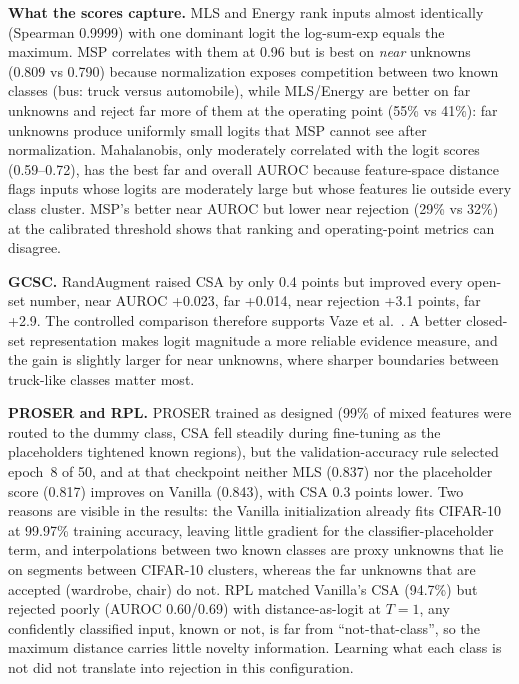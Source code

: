 \documentclass{article}
\begin{document}
\textbf{What the scores capture.} MLS and Energy rank inputs almost identically (Spearman 0.9999) with one dominant logit the log-sum-exp equals the maximum. MSP correlates with them at 0.96 but is best on \emph{near} unknowns (0.809 vs 0.790) because normalization exposes competition between two known classes (bus: truck versus automobile), while MLS/Energy are better on far unknowns and reject far more of them at the operating point (55\% vs 41\%): far unknowns produce uniformly small logits that MSP cannot see after normalization. Mahalanobis, only moderately correlated with the logit scores (0.59--0.72), has the best far and overall AUROC because feature-space distance flags inputs whose logits are moderately large but whose features lie outside every class cluster. MSP's better near AUROC but lower near rejection
(29\% vs 32\%) at the calibrated threshold shows that ranking and operating-point metrics can disagree.

\textbf{GCSC.} RandAugment raised CSA by only 0.4 points but improved every open-set number, near AUROC +0.023, far +0.014, near rejection +3.1 points, far +2.9. The controlled comparison therefore supports Vaze et al.~\cite{vaze2022osr}.  A better closed-set representation makes logit magnitude a more reliable evidence measure, and the gain is slightly larger for near unknowns, where sharper boundaries between truck-like classes matter most.

\textbf{PROSER and RPL.} PROSER trained as designed (99\% of mixed features were routed to the dummy class, CSA fell steadily during fine-tuning as the placeholders tightened known regions), but the validation-accuracy rule selected epoch~8 of 50, and at that checkpoint neither MLS (0.837) nor the placeholder score (0.817) improves on Vanilla (0.843), with CSA 0.3 points lower. Two reasons are visible in the results: the Vanilla initialization already fits CIFAR-10 at
99.97\% training accuracy, leaving little gradient for the classifier-placeholder term, and interpolations between two known classes are proxy unknowns that lie on segments between CIFAR-10 clusters, whereas the far unknowns that are accepted (wardrobe, chair) do not. RPL matched Vanilla's CSA (94.7\%) but rejected poorly (AUROC 0.60/0.69) with distance-as-logit at $T=1$, any confidently classified input, known or not, is far from ``not-that-class'', so the
maximum distance carries little novelty information. Learning what each class is not did not translate into rejection
in this configuration.
\end{document}
